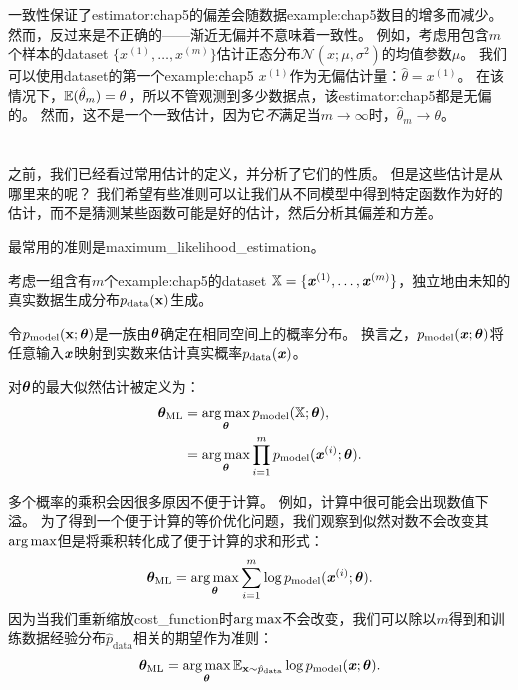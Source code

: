 一致性保证了\gls{estimator:chap5}的偏差会随数据\gls{example:chap5}数目的增多而减少。
然而，反过来是不正确的——渐近无偏并不意味着一致性。
例如，考虑用包含$m$个样本的\gls{dataset} $\{x^{(1)},\dots,x^{(m)}\}$估计正态分布$\mathcal{N}(x;\mu,\sigma^2)$的均值参数$\mu$。
我们可以使用\gls{dataset}的第一个\gls{example:chap5} $x^{(1)}$作为无偏估计量：$\hat{\theta} = x^{(1)}$。
在该情况下，$\mathbb{E}(\hat{\theta}_m) = \theta$，所以不管观测到多少数据点，该\gls{estimator:chap5}都是无偏的。
然而，这不是一个一致估计，因为它\emph{不}满足当$m\to\infty$时，$\hat{\theta}_m \to \theta$。


\section{}
\label{sec:maximum_likelihood_estimation}
之前，我们已经看过常用估计的定义，并分析了它们的性质。
但是这些估计是从哪里来的呢？
我们希望有些准则可以让我们从不同模型中得到特定函数作为好的估计，而不是猜测某些函数可能是好的估计，然后分析其偏差和方差。

最常用的准则是\gls{maximum_likelihood_estimation}。

考虑一组含有$m$个\gls{example:chap5}的\gls{dataset} $\mathbb{X}=\{ \boldsymbol{\mathit{x}}^{(1)},\dots, \boldsymbol{\mathit{x}}^{(m)} \}$，独立地由未知的真实数据生成分布$p_{\text{data}}(\mathbf{x})$生成。

令$p_{\text{model}}( \mathbf{x}; \boldsymbol{\theta} )$是一族由$\boldsymbol{\theta}$确定在相同空间上的概率分布。
换言之，$p_{\text{model}}(\boldsymbol{\mathit{x}};\boldsymbol{\theta})$将任意输入$\boldsymbol{\mathit{x}}$映射到实数来估计真实概率$p_{\text{data}}(\boldsymbol{\mathit{x}})$。

对$\boldsymbol{\theta}$的最大似然估计被定义为：
\begin{align}
    \boldsymbol{\theta}_{\text{ML}} &= \underset{\boldsymbol{\theta}}{\arg\max} \, p_{\text{model}} (\mathbb{X}; \boldsymbol{\theta}), \\
        &= \underset{\boldsymbol{\theta}}{\arg\max} \prod_{i=1}^m p_{\text{model}} (\boldsymbol{\mathit{x}}^{(i)}; \boldsymbol{\theta}).
\end{align}

多个概率的乘积会因很多原因不便于计算。
例如，计算中很可能会出现数值下溢。
为了得到一个便于计算的等价优化问题，我们观察到似然对数不会改变其$\arg\max$但是将乘积转化成了便于计算的求和形式：
\begin{equation}
    \boldsymbol{\theta}_{\text{ML}} = \underset{\boldsymbol{\theta}}{\arg\max} \sum_{i=1}^m \log p_{\text{model}} (\boldsymbol{\mathit{x}}^{(i)}; \boldsymbol{\theta}) .
\end{equation}
因为当我们重新缩放\gls{cost_function}时$\arg\max$不会改变，我们可以除以$m$得到和训练数据经验分布$\hat{p}_{\text{data}}$相关的期望作为准则：
\begin{equation}
\label{eq:5.59}
    \boldsymbol{\theta}_{\text{ML}} = \underset{\boldsymbol{\theta}}{\arg\max} \,\mathbb{E}_{\mathbf{x} \sim \hat{p}_{\text{data}}} \log p_{\text{model}} (\boldsymbol{\mathit{x}}; \boldsymbol{\theta}) .
\end{equation}

